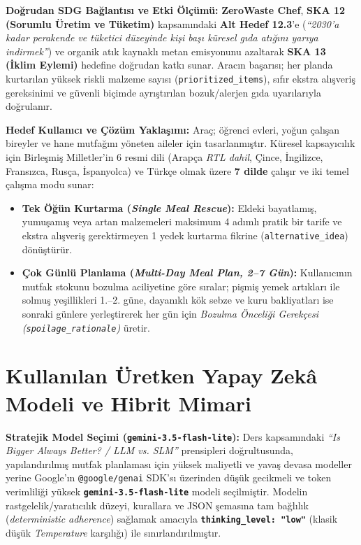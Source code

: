 \documentclass[9pt,a4paper]{article}
\begin{document}
\textbf{Doğrudan SDG Bağlantısı ve Etki Ölçümü:} \textbf{ZeroWaste Chef}, \textbf{SKA 12 (Sorumlu Üretim ve Tüketim)} kapsamındaki \textbf{Alt Hedef 12.3}'e (\emph{``2030'a kadar perakende ve tüketici düzeyinde kişi başı küresel gıda atığını yarıya indirmek''}) ve organik atık kaynaklı metan emisyonunu azaltarak \textbf{SKA 13 (İklim Eylemi)} hedefine doğrudan katkı sunar. Aracın başarısı; her planda kurtarılan yüksek riskli malzeme sayısı (\texttt{prioritized\_items}), sıfır ekstra alışveriş gereksinimi ve güvenli biçimde ayrıştırılan bozuk/alerjen gıda uyarılarıyla doğrulanır.

\textbf{Hedef Kullanıcı ve Çözüm Yaklaşımı:} Araç; öğrenci evleri, yoğun çalışan bireyler ve hane mutfağını yöneten aileler için tasarlanmıştır. Küresel kapsayıcılık için Birleşmiş Milletler'in 6 resmi dili (Arapça \emph{RTL dahil}, Çince, İngilizce, Fransızca, Rusça, İspanyolca) ve Türkçe olmak üzere \textbf{7 dilde} çalışır ve iki temel çalışma modu sunar:
\begin{itemize}
  \item \textbf{Tek Öğün Kurtarma (\emph{Single Meal Rescue}):} Eldeki bayatlamış, yumuşamış veya artan malzemeleri maksimum 4 adımlı pratik bir tarife ve ekstra alışveriş gerektirmeyen 1 yedek kurtarma fikrine (\texttt{alternative\_idea}) dönüştürür.
  \item \textbf{Çok Günlü Planlama (\emph{Multi-Day Meal Plan, 2--7 Gün}):} Kullanıcının mutfak stokunu bozulma aciliyetine göre sıralar; pişmiş yemek artıkları ile solmuş yeşillikleri 1.--2. güne, dayanıklı kök sebze ve kuru bakliyatları ise sonraki günlere yerleştirerek her gün için \emph{Bozulma Önceliği Gerekçesi (\texttt{spoilage\_rationale})} üretir.
\end{itemize}

\section{Kullanılan Üretken Yapay Zekâ Modeli ve Hibrit Mimari}
\textbf{Stratejik Model Seçimi (\texttt{gemini-3.5-flash-lite}):} Ders kapsamındaki \emph{``Is Bigger Always Better? / LLM vs. SLM''} prensipleri doğrultusunda, yapılandırılmış mutfak planlaması için yüksek maliyetli ve yavaş devasa modeller yerine Google'ın \texttt{@google/genai} SDK'sı üzerinden düşük gecikmeli ve token verimliliği yüksek \textbf{\texttt{gemini-3.5-flash-lite}} modeli seçilmiştir. Modelin rastgelelik/yaratıcılık düzeyi, kurallara ve JSON şemasına tam bağlılık (\emph{deterministic adherence}) sağlamak amacıyla \textbf{\texttt{thinking\_level: "low"}} (klasik düşük \emph{Temperature} karşılığı) ile sınırlandırılmıştır.
\end{document}
